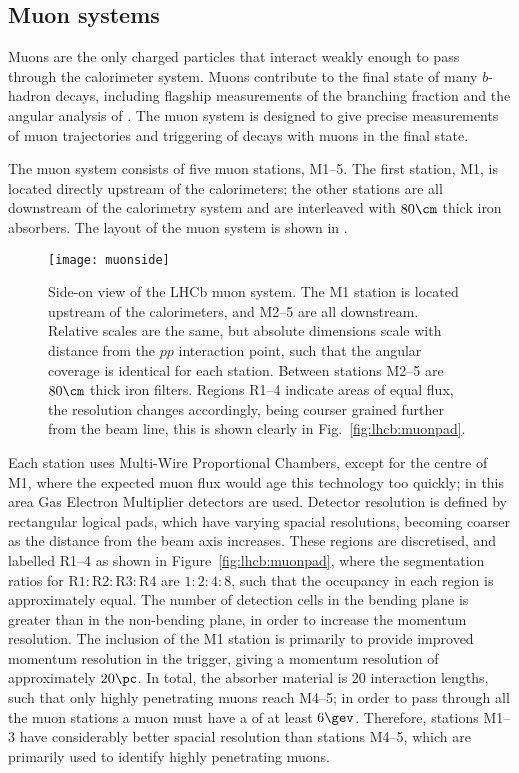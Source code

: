 \subsection{Muon systems}


Muons are the only charged particles that interact weakly enough to pass through the calorimeter
system.
Muons contribute to the final state of many $b$-hadron decays, including  flagship
measurements of  the branching fraction \decay{\Bs}{\mumu} and the angular analysis of
\decay{\Bd}{\Kstarz\mumu}.
The muon system is designed to give precise measurements of muon trajectories and triggering of
decays with muons in the final state.

The muon system consists of five muon stations, M1--5.
The first station, M1, is located directly upstream of the calorimeters; the other stations are all
downstream of the calorimetry system and are interleaved with $80\cm$ thick iron absorbers.
The layout of the \lhcb muon system is shown in .

\begin{figure}
  \begin{center}
    \texttt{[image: muonside]}
    \caption[Side-on diagram of the LHCb muon system]
    {
      Side-on view of the LHCb muon system.
      The M1 station is located upstream of the calorimeters, and M2--5 are all downstream.
      Relative scales are the same, but absolute dimensions scale with distance from the $pp$
      interaction point, such that the angular coverage is identical for each station.
      Between stations M2--5 are $80\cm$ thick iron filters.
      Regions R1--4 indicate areas of equal flux, the resolution changes accordingly, being courser
      grained further from the beam line, this is shown clearly in
      Fig.~\protect\ref{fig:lhcb:muonpad}.
    }
    \label{fig:lhcb:muonside}
  \end{center}
\end{figure}

Each station uses Multi-Wire Proportional Chambers, except for the centre of M1, where
the expected muon flux would age this technology too quickly; in this area Gas Electron Multiplier
detectors are used.
Detector resolution is defined by rectangular logical pads, which have varying spacial resolutions,
becoming coarser as the distance from the beam axis increases.
These regions are discretised, and labelled R1--4 as shown in Figure~\ref{fig:lhcb:muonpad},
where the segmentation ratios for $\mathrm{R}1:\mathrm{R}2:\mathrm{R}3:\mathrm{R}4$ are $1:2:4:8$,
such that the occupancy in each region is approximately equal.
The number of detection cells in the bending plane is greater than in the non-bending plane, in
order to increase the momentum resolution.
The inclusion of the M1 station is primarily to provide improved momentum resolution in the
trigger, giving a momentum resolution of approximately $20\pc$.
In total, the absorber material is 20 interaction lengths, such that only highly penetrating muons
reach M4--5; in order to pass through all the muon stations a muon must have a \pt of at least
$6\gev$.
Therefore, stations M1--3 have considerably better spacial resolution than stations M4--5, which
are primarily used to identify highly penetrating muons.

